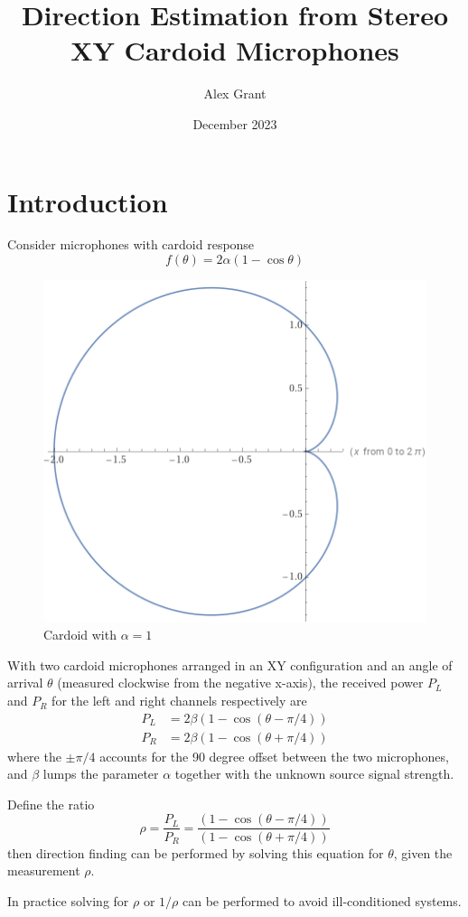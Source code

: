 \documentclass{article}
\title{Direction Estimation from Stereo XY Cardoid Microphones}
\author{Alex Grant}
\date{December 2023}
\begin{document}
\maketitle

\section{Introduction}
Consider microphones with cardoid response
\begin{equation*}
    f(\theta) = 2\alpha(1-\cos\theta)
\end{equation*}

\begin{figure}
    \centering
    \includegraphics[width=0.5\linewidth]{cardoid.png}
    \caption{Cardoid with $\alpha=1$}
    \label{fig:cardoid}
\end{figure}

With two cardoid microphones arranged in an XY configuration and an angle of arrival $\theta$ (measured clockwise from the negative x-axis), the received power $P_L$ and $P_R$ for the left and right channels respectively are
\begin{align*}
    P_L &= 2\beta(1-\cos(\theta-\pi/4)) \\
    P_R &= 2\beta(1-\cos(\theta+\pi/4))
\end{align*}
where the $\pm \pi/4$ accounts for the 90 degree offset between the two microphones, and $\beta$ lumps the parameter $\alpha$ together with the unknown source signal strength.

Define the ratio
\begin{equation}
    \rho = \frac{P_L}{P_R} = \frac{(1-\cos(\theta-\pi/4))}{(1-\cos(\theta+\pi/4))}
\end{equation}
then direction finding can be performed by solving this equation for $\theta$, given the measurement $\rho$.

In practice solving for $\rho$ or $1/\rho$ can be performed to avoid ill-conditioned systems.
\end{document}

